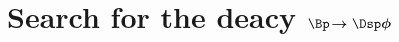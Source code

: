 \chapter[Search for the deacy $\Bp\!\to\Dsp\phi$]{Search for the deacy $\boldsymbol{\Bp\!\to\Dsp\phi}$}
\label{ch:dsphi}

%
%
%
%
%
%
%
%
%
%
%
%
%

